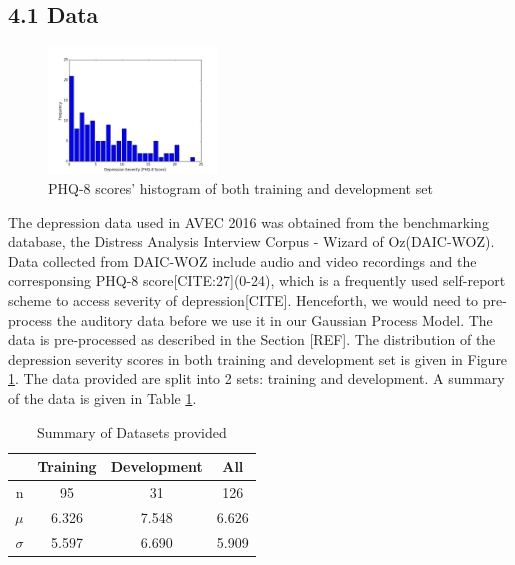 \documentclass{article}
\begin{document}
	\subsection{4.1 Data}
	\begin{figure}[h]
 	\includegraphics[width=0.40\textwidth]{histogram_phq8}
	\caption{PHQ-8 scores' histogram of both training and development set}
	\label{histogram_phq8}
	\end{figure}
	
	The depression data used in AVEC 2016 was obtained from the benchmarking database, the Distress Analysis Interview Corpus - Wizard of Oz(DAIC-WOZ). Data collected from DAIC-WOZ include audio and video recordings and the corresponsing PHQ-8 score[CITE:27](0-24), which is a frequently used self-report scheme to access severity of depression[CITE]. Henceforth, we would need to pre-process the auditory data before we use it in our Gaussian Process Model. The data is pre-processed as described in the Section [REF]. The distribution of the depression severity scores in both training and development set is given in Figure \ref{histogram_phq8}. The data provided are split into 2 sets: training and development. A summary of the data is given in Table \ref{summary_table}.

 	\begin{table}[h]
 		\begin{center}
  			\begin{tabular}{ | r | c | c || c | }
    			\hline
			 & Training & Development & All \\ \hline
			 n               & 95 & 31 & 126 \\ \hline
			 $\mu$           & 6.326 & 7.548 & 6.626 \\ \hline
			 $\sigma$        & 5.597 & 6.690 & 5.909 \\ \hline
			 \end{tabular}
		\end{center}
 	\caption{Summary of Datasets provided}
 	\label{summary_table}
 	\end{table}
\end{document}
